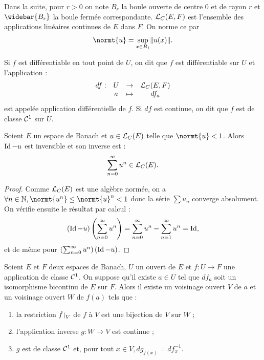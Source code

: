 \begin{nota}
Dans la suite, pour $r>0$ on note $B_r$ la boule ouverte de centre 0 et de rayon $r$ et $\widebar{B_r}$ la boule fermée correspondante.
$\mathcal{L}_C(E,F)$ est l'ensemble des applications linéaires continues de $E$ dans $F$. On norme ce \Rev par 
\[ \normt{u} = \sup_{x \in B_1} \norm{u(x)} . \]
\end{nota}

\begin{defn}
Si $f$ est différentiable en tout point de $U$, on dit que $f$ est différentiable sur $U$ et l'application :
\[ \begin{array}{c c c c}
df : & U & \to & \mathcal{L}_C(E,F) \\
& a & \mapsto & df_a
\end{array} \]
est appelée application différentielle de $f$. Si $df$ est continue, on dit que $f$ est de classe $\mathcal{C}^1$ sur $U$.
\end{defn}

\begin{lem}
\label{lem:inv}
Soient $E$ un espace de Banach et $u \in \mathcal{L}_C(E)$ telle que $\normt{u} <1$. Alors $\operatorname{Id} - u$ est inversible et son inverse est :
\[ \sum_{n=0}^{\infty} u^n \in \mathcal{L}_C(E) . \]
\end{lem}

\begin{proof}
Comme $\mathcal{L}_C(E)$ est une algèbre normée, on a $\forall n \in \N, \normt{u^n} \leq \normt{u}^n < 1$ donc la série $\sum u_n$ converge
absolument. On vérifie ensuite le résultat par calcul :
\[ (\operatorname{Id}-u) \left ( \sum_{n=0}^{\infty} u^n \right ) = \sum_{n=0}^{\infty} u^n - \sum_{n=1}^{\infty} u^n = \operatorname{Id}, \]
et de même pour $\left ( \sum_{n=0}^{\infty} u^n \right ) (\operatorname{Id} - u)$.
\end{proof}

\begin{thm}
Soient $E$ et $F$ deux espaces de Banach, $U$ un ouvert de $E$ et $f:U \to F$ une application de classe $\mathcal{C}^1$.
On suppose qu'il existe $a \in U$ tel que $df_a$ soit un isomorphisme bicontinu de $E$ sur $F$. 
Alors il existe un voisinage ouvert $V$ de $a$ et un voisinage ouvert $W$ de $f(a)$ tels que :
\begin{enumerate}[label=(\roman*)]
\item la restriction $\restr{f}{V}$ de $f$ à $V$ est une bijection de $V$ sur $W$ ;
\item l'application inverse $g:W \to V$ est continue ;
\item $g$ est de classe $\mathcal{C}^1$ et, pour tout $x \in V, dg_{f(x)} = df_x^{-1}$.
\end{enumerate}
\end{thm}

